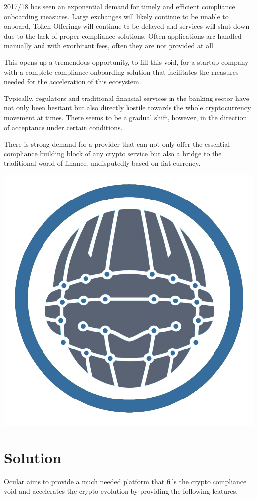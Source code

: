 \documentclass[a4paper]{article}
\begin{document}
2017/18 has seen an exponential demand for timely and efficient compliance onboarding measures.  Large exchanges will likely continue to be unable to onboard, Token Offerings will continue to be delayed and services will shut down due to the lack of proper compliance solutions. Often applications are handled manually and with exorbitant fees, often they are not provided at all.  

This opens up a tremendous opportunity, to fill this void, for a startup company with a complete compliance onboarding solution that facilitates the measures needed for the acceleration of this ecosystem. 

Typically, regulators and traditional financial services in the banking sector have not only been hesitant but also directly hostile towards the whole cryptocurrency movement at times. There seems to be a gradual shift, however, in the direction of acceptance under certain conditions. 

There is strong demand for a provider that can not only offer the essential compliance building block of any crypto service but also a bridge to the traditional world of finance, undisputedly based on fiat currency.  

\clearpage
\centerline{\includegraphics[width=1.0\textwidth]{ocular-head}}
\section{Solution}
Ocular aims to provide a much needed platform that fills the crypto compliance void and accelerates the crypto evolution by providing the following features. 
\end{document}
